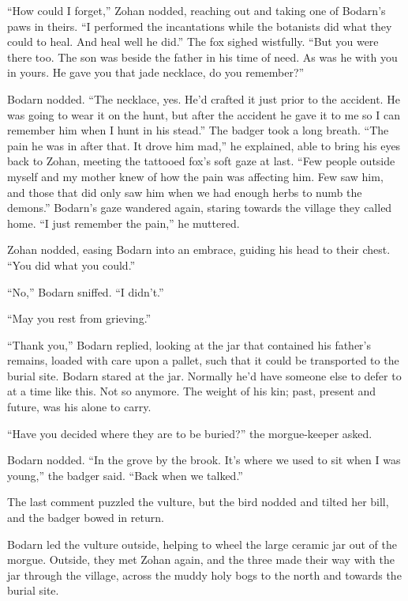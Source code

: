 ``How could I forget,'' Zohan nodded, reaching out and taking one of Bodarn's paws in theirs. ``I performed the incantations while the botanists did what they could to heal. And heal well he did.'' The fox sighed wistfully. ``But you were there too. The son was beside the father in his time of need. As was he with you in yours. He gave you that jade necklace, do you remember?''

Bodarn nodded. ``The necklace, yes. He'd crafted it just prior to the accident. He was going to wear it on the hunt, but after the accident he gave it to me so I can remember him when I hunt in his stead.'' The badger took a long breath. ``The pain he was in after that. It drove him mad,'' he explained, able to bring his eyes back to Zohan, meeting the tattooed fox's soft gaze at last. ``Few people outside myself and my mother knew of how the pain was affecting him. Few saw him, and those that did only saw him when we had enough herbs to numb the demons.'' Bodarn's gaze wandered again, staring towards the village they called home. ``I just remember the pain,'' he muttered.

Zohan nodded, easing Bodarn into an embrace, guiding his head to their chest. ``You did what you could.''

``No,'' Bodarn sniffed. ``I didn't.''

\secdiv

\noindent ``May you rest from grieving.''

``Thank you,'' Bodarn replied, looking at the jar that contained his father's remains, loaded with care upon a pallet, such that it could be transported to the burial site. Bodarn stared at the jar. Normally he'd have someone else to defer to at a time like this. Not so anymore. The weight of his kin; past, present and future, was his alone to carry.

``Have you decided where they are to be buried?'' the morgue-keeper asked.

Bodarn nodded. ``In the grove by the brook. It's where we used to sit when I was young,'' the badger said. ``Back when we talked.''

The last comment puzzled the vulture, but the bird nodded and tilted her bill, and the badger bowed in return.

Bodarn led the vulture outside, helping to wheel the large ceramic jar out of the morgue. Outside, they met Zohan again, and the three made their way with the jar through the village, across the muddy holy bogs to the north and towards the burial site.

